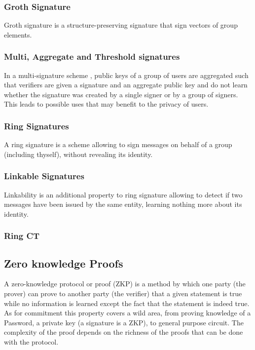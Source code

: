 \documentclass[11pt]{llncs2e/llncs}
\begin{document}
\subsubsection{Groth Signature}
Groth signature \cite{SigGroth} is a structure-preserving signature that sign vectors of group elements.

\subsubsection{Multi, Aggregate and Threshold signatures}

 In a multi-signature scheme \cite{Musig2}, public keys of a group of users are aggregated such that verifiers are given a signature and an aggregate public key and do not  learn whether the signature was created by a single signer or by a group of signers. This leads to possible uses that may benefit to the privacy of users. 

 
\subsubsection{Ring Signatures}

A ring signature is a scheme allowing to sign messages on behalf of a group (including thyself), without revealing its identity. 

\subsubsection{Linkable Signatures}
Linkability is an additional property to ring signature allowing to detect if two messages have been issued by the same entity, learning nothing more about its identity. 

\subsubsection{Ring CT}


\subsection{Zero knowledge Proofs}
A zero-knowledge protocol or proof (ZKP) is a method by which one party (the prover) can prove to another party (the verifier) that a given statement is true while no information is learned except the fact that the statement is indeed true. As for commitment this property covers a wild area, from proving knowledge of a Password, a private key (a signature is a ZKP), to general purpose circuit. The complexity of the proof depends on the richness of the proofs that can be done with the protocol. 
\end{document}
